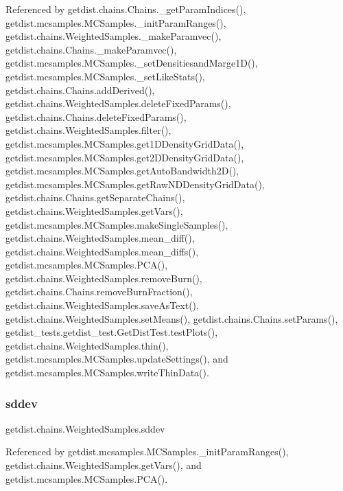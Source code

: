 Referenced by getdist.\+chains.\+Chains.\+\_\+get\+Param\+Indices(), getdist.\+mcsamples.\+M\+C\+Samples.\+\_\+init\+Param\+Ranges(), getdist.\+chains.\+Weighted\+Samples.\+\_\+make\+Paramvec(), getdist.\+chains.\+Chains.\+\_\+make\+Paramvec(), getdist.\+mcsamples.\+M\+C\+Samples.\+\_\+set\+Densitiesand\+Marge1\+D(), getdist.\+mcsamples.\+M\+C\+Samples.\+\_\+set\+Like\+Stats(), getdist.\+chains.\+Chains.\+add\+Derived(), getdist.\+chains.\+Weighted\+Samples.\+delete\+Fixed\+Params(), getdist.\+chains.\+Chains.\+delete\+Fixed\+Params(), getdist.\+chains.\+Weighted\+Samples.\+filter(), getdist.\+mcsamples.\+M\+C\+Samples.\+get1\+D\+Density\+Grid\+Data(), getdist.\+mcsamples.\+M\+C\+Samples.\+get2\+D\+Density\+Grid\+Data(), getdist.\+mcsamples.\+M\+C\+Samples.\+get\+Auto\+Bandwidth2\+D(), getdist.\+mcsamples.\+M\+C\+Samples.\+get\+Raw\+N\+D\+Density\+Grid\+Data(), getdist.\+chains.\+Chains.\+get\+Separate\+Chains(), getdist.\+chains.\+Weighted\+Samples.\+get\+Vars(), getdist.\+mcsamples.\+M\+C\+Samples.\+make\+Single\+Samples(), getdist.\+chains.\+Weighted\+Samples.\+mean\+\_\+diff(), getdist.\+chains.\+Weighted\+Samples.\+mean\+\_\+diffs(), getdist.\+mcsamples.\+M\+C\+Samples.\+P\+C\+A(), getdist.\+chains.\+Weighted\+Samples.\+remove\+Burn(), getdist.\+chains.\+Chains.\+remove\+Burn\+Fraction(), getdist.\+chains.\+Weighted\+Samples.\+save\+As\+Text(), getdist.\+chains.\+Weighted\+Samples.\+set\+Means(), getdist.\+chains.\+Chains.\+set\+Params(), getdist\+\_\+tests.\+getdist\+\_\+test.\+Get\+Dist\+Test.\+test\+Plots(), getdist.\+chains.\+Weighted\+Samples.\+thin(), getdist.\+mcsamples.\+M\+C\+Samples.\+update\+Settings(), and getdist.\+mcsamples.\+M\+C\+Samples.\+write\+Thin\+Data().

\mbox{\label{classgetdist_1_1chains_1_1WeightedSamples_a739f1abc86f6ff5f37eb2f0fe919050d}} 
\subsubsection{\texorpdfstring{sddev}{sddev}}
{\footnotesize\ttfamily getdist.\+chains.\+Weighted\+Samples.\+sddev}



Referenced by getdist.\+mcsamples.\+M\+C\+Samples.\+\_\+init\+Param\+Ranges(), getdist.\+chains.\+Weighted\+Samples.\+get\+Vars(), and getdist.\+mcsamples.\+M\+C\+Samples.\+P\+C\+A().

